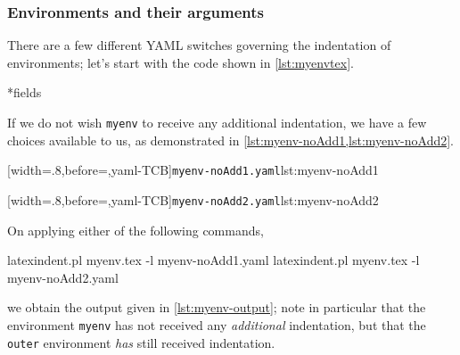\subsubsection{Environments and their arguments}\label{subsubsec:env-and-their-args}
 There are a few different YAML switches governing the indentation of environments; let's
 start with the code shown in \cref{lst:myenvtex}.


*{fields}
 \begin{example}
 If we do not wish \texttt{myenv} to receive any additional indentation, we have a few
 choices available to us, as demonstrated in \cref{lst:myenv-noAdd1,lst:myenv-noAdd2}.

 \begin{minipage}{.45\textwidth}
  [width=.8\linewidth,before=\centering,yaml-TCB]{\texttt{myenv-noAdd1.yaml}}{lst:myenv-noAdd1}
 \end{minipage}
 \hfill
 \begin{minipage}{.45\textwidth}
  [width=.8\linewidth,before=\centering,yaml-TCB]{\texttt{myenv-noAdd2.yaml}}{lst:myenv-noAdd2}
 \end{minipage}

 On applying either of the following commands, 

 \begin{commandshell}
latexindent.pl myenv.tex -l myenv-noAdd1.yaml  
latexindent.pl myenv.tex -l myenv-noAdd2.yaml  
\end{commandshell}

 we obtain the output given in \cref{lst:myenv-output}; note in particular that the
 environment \texttt{myenv} has not received any \emph{additional} indentation, but that
 the \texttt{outer} environment \emph{has} still received indentation.

 \end{example}

